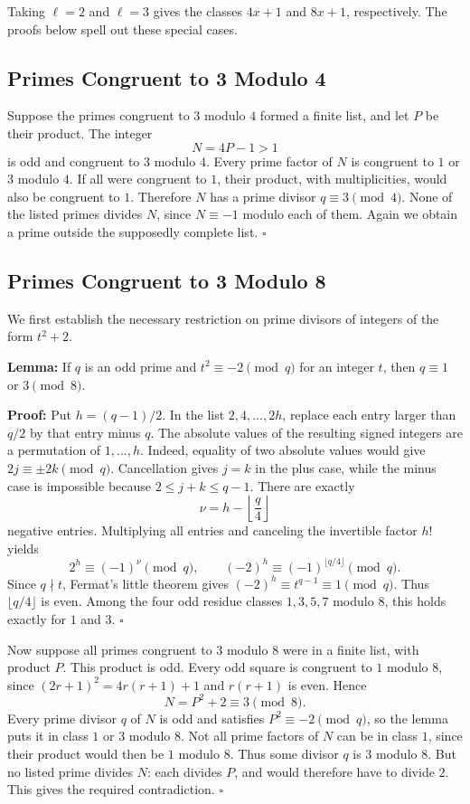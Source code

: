 \documentclass[a4paper,11pt,abstracton]{scrartcl}
\theoremstyle{dotlessP}
\theoremstyle{dotlessS}
\theoremstyle{remark}
\theoremstyle{definition}
\begin{document}
Taking $\ell=2$ and $\ell=3$ gives the classes $4x+1$ and $8x+1$,
respectively. The proofs below spell out these special cases.

\subsection{Primes Congruent to 3 Modulo 4}

Suppose the primes congruent to $3$ modulo $4$ formed a finite list,
and let $P$ be their product. The integer
\[
    N=4P-1>1
\]
is odd and congruent to $3$ modulo $4$.
Every prime factor of $N$ is congruent to $1$ or $3$ modulo $4$.
If all were congruent to $1$, their product, with multiplicities, would
also be congruent to $1$. Therefore $N$ has a prime divisor
$q\equiv3\pmod4$.
None of the listed primes divides $N$, since $N\equiv-1$ modulo each
of them. Again we obtain a prime outside the supposedly complete list.
\hfill$\square$

\subsection{Primes Congruent to 3 Modulo 8}

We first establish the necessary restriction on prime divisors of
integers of the form $t^2+2$.

\begin{remark_box}
\textbf{Lemma:}
If $q$ is an odd prime and $t^2\equiv-2\pmod q$ for an integer $t$,
then $q\equiv1$ or $3\pmod8$.
\end{remark_box}

\textbf{Proof:}
Put $h=(q-1)/2$. In the list $2,4,\ldots,2h$, replace each entry
larger than $q/2$ by that entry minus $q$.
The absolute values of the resulting signed integers are a permutation
of $1,\ldots,h$. Indeed, equality of two absolute values would give
$2j\equiv\pm2k\pmod q$. Cancellation gives $j=k$ in the plus case,
while the minus case is impossible because $2\leq j+k\leq q-1$.
There are exactly
\[
    \nu=h-\left\lfloor\frac q4\right\rfloor
\]
negative entries. Multiplying all entries and canceling the invertible
factor $h!$ yields
\[
    2^h\equiv(-1)^\nu\pmod q,\qquad
    (-2)^h\equiv(-1)^{\lfloor q/4\rfloor}\pmod q.
\]
Since $q\nmid t$, Fermat's little theorem gives
$(-2)^h\equiv t^{q-1}\equiv1\pmod q$.
Thus $\lfloor q/4\rfloor$ is even. Among the four odd residue classes
$1,3,5,7$ modulo $8$, this holds exactly for $1$ and $3$.
\hfill$\square$


Now suppose all primes congruent to $3$ modulo $8$ were in a finite
list, with product $P$. This product is odd. Every odd square is
congruent to $1$ modulo $8$, since
$(2r+1)^2=4r(r+1)+1$ and $r(r+1)$ is even. Hence
\[
    N=P^2+2\equiv3\pmod8.
\]
Every prime divisor $q$ of $N$ is odd and satisfies $P^2\equiv-2\pmod q$,
so the lemma puts it in class $1$ or $3$ modulo $8$.
Not all prime factors of $N$ can be in class $1$, since their product
would then be $1$ modulo $8$. Thus some divisor $q$ is $3$ modulo $8$.
But no listed prime divides $N$: each divides $P$, and would therefore
have to divide $2$. This gives the required contradiction.
\hfill$\square$
\end{document}
